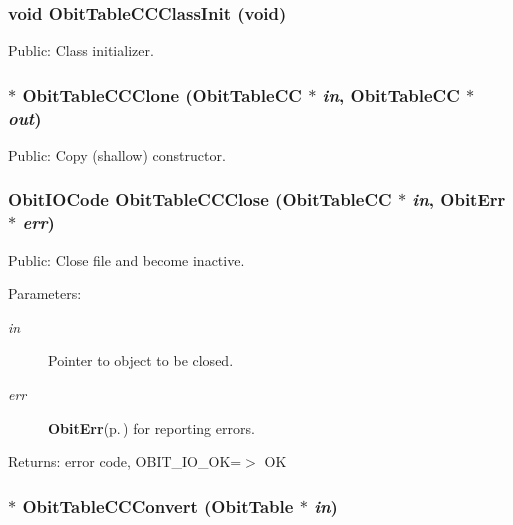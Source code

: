 \subsubsection{\setlength{\rightskip}{0pt plus 5cm}void Obit\-Table\-CCClass\-Init (void)}\label{ObitTableCC_8h_a10}


Public: Class initializer. 

\subsubsection{$\ast$ Obit\-Table\-CCClone ({\bf Obit\-Table\-CC} $\ast$ {\em in}, {\bf Obit\-Table\-CC} $\ast$ {\em out})}\label{ObitTableCC_8h_a15}


Public: Copy (shallow) constructor. 

\subsubsection{\setlength{\rightskip}{0pt plus 5cm}Obit\-IOCode Obit\-Table\-CCClose ({\bf Obit\-Table\-CC} $\ast$ {\em in}, {\bf Obit\-Err} $\ast$ {\em err})}\label{ObitTableCC_8h_a21}


Public: Close file and become inactive. 

\begin{Desc}
\item[Parameters:]
\begin{description}
\item[{\em in}]Pointer to object to be closed. \item[{\em err}]{\bf Obit\-Err}{\rm (p.\,\pageref{structObitErr})} for reporting errors. \end{description}
\end{Desc}
\begin{Desc}
\item[Returns:]error code, OBIT\_\-IO\_\-OK=$>$ OK \end{Desc}
\subsubsection{$\ast$ Obit\-Table\-CCConvert ({\bf Obit\-Table} $\ast$ {\em in})}\label{ObitTableCC_8h_a16}


